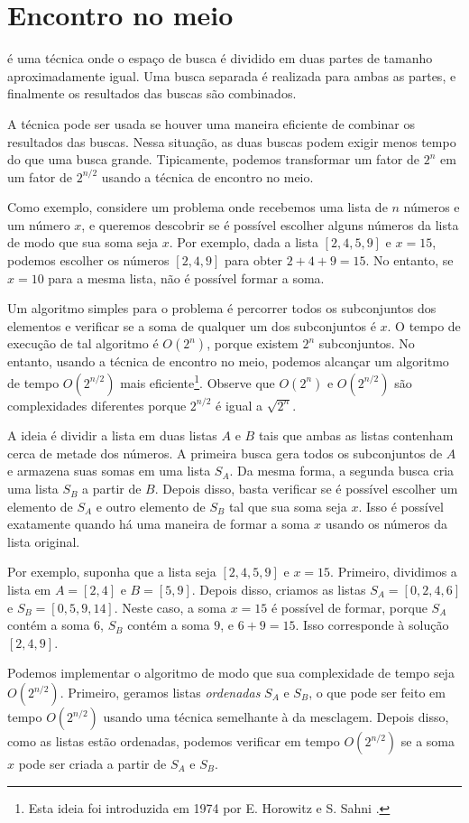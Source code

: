 \section{Encontro no meio}


 é uma técnica
onde o espaço de busca é dividido em
duas partes de tamanho aproximadamente igual.
Uma busca separada é realizada
para ambas as partes,
e finalmente os resultados das buscas são combinados.

A técnica pode ser usada
se houver uma maneira eficiente de combinar os
resultados das buscas.
Nessa situação, as duas buscas podem exigir menos
tempo do que uma busca grande.
Tipicamente, podemos transformar um fator de $2^n$
em um fator de $2^{n/2}$ usando a técnica de encontro no meio.

Como exemplo, considere um problema onde
recebemos uma lista de $n$ números e
um número $x$,
e queremos descobrir se é possível
escolher alguns números da lista de modo que
sua soma seja $x$.
Por exemplo, dada a lista $[2,4,5,9]$ e $x=15$,
podemos escolher os números $[2,4,9]$ para obter $2+4+9=15$.
No entanto, se $x=10$ para a mesma lista,
não é possível formar a soma.

Um algoritmo simples para o problema é
percorrer todos os subconjuntos dos elementos e
verificar se a soma de qualquer um dos subconjuntos é $x$.
O tempo de execução de tal algoritmo é $O(2^n)$,
porque existem $2^n$ subconjuntos.
No entanto, usando a técnica de encontro no meio,
podemos alcançar um algoritmo de tempo $O(2^{n/2})$ mais eficiente\footnote{Esta
ideia foi introduzida em 1974 por E. Horowitz e S. Sahni \cite{hor74}.}.
Observe que $O(2^n)$ e $O(2^{n/2})$ são complexidades
diferentes porque $2^{n/2}$ é igual a $\sqrt{2^n}$.

A ideia é dividir a lista em
duas listas $A$ e $B$ tais que ambas
as listas contenham cerca de metade dos números.
A primeira busca gera todos os subconjuntos
de $A$ e armazena suas somas em uma lista $S_A$.
Da mesma forma, a segunda busca cria
uma lista $S_B$ a partir de $B$.
Depois disso, basta verificar se é possível
escolher um elemento de $S_A$ e outro
elemento de $S_B$ tal que sua soma seja $x$.
Isso é possível exatamente quando há uma maneira de
formar a soma $x$ usando os números da lista original.

Por exemplo, suponha que a lista seja $[2,4,5,9]$ e $x=15$.
Primeiro, dividimos a lista em $A=[2,4]$ e $B=[5,9]$.
Depois disso, criamos as listas
$S_A=[0,2,4,6]$ e $S_B=[0,5,9,14]$.
Neste caso, a soma $x=15$ é possível de formar,
porque $S_A$ contém a soma $6$,
$S_B$ contém a soma $9$, e $6+9=15$.
Isso corresponde à solução $[2,4,9]$.

Podemos implementar o algoritmo de modo que
sua complexidade de tempo seja $O(2^{n/2})$.
Primeiro, geramos listas \emph{ordenadas} $S_A$ e $S_B$,
o que pode ser feito em tempo $O(2^{n/2})$ usando uma técnica semelhante à da mesclagem.
Depois disso, como as listas estão ordenadas,
podemos verificar em tempo $O(2^{n/2})$ se
a soma $x$ pode ser criada a partir de $S_A$ e $S_B$.
